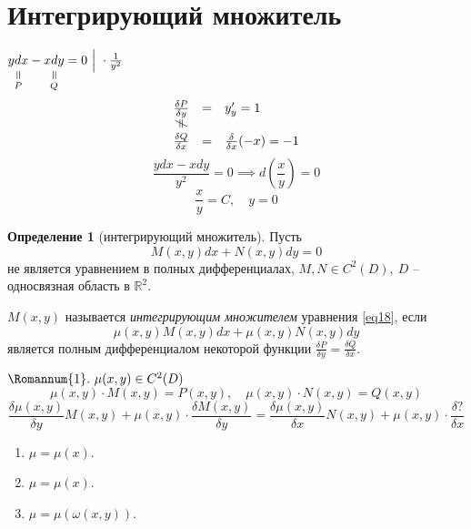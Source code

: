 \documentclass[11pt,a4paper,oneside]{report}
\newcommand{\verteq}[0]{\rotatebox{90}{$=$}}
\newcommand{\vertneq}[0]{\rotatebox{90}{$\ne$}}
\newcommand{\equalto}[2]{\underset{\scriptstyle\overset{\mkern4mu\verteq}{#2}}{#1}}
\theoremstyle{definition}
\newtheorem{definition}{Определение}[section]
\theoremstyle{plain}
\theoremstyle{remark}
\begin{document}
\section{Интегрирующий множитель}

$\equalto{ydx}{P} - \equalto{xdy}{Q} = 0 \ \Big| \ \cdot \frac{1}{y^2}$
\begin{equation*}
    \begin{array}{ccl}
        \frac{\delta P}{\delta y} & = & y_y' = 1                         \\
        \vertneq                  &   &                                  \\
        \frac{\delta Q}{\delta x} & = & \frac{\delta}{\delta x}(-x) = -1
    \end{array}
\end{equation*}
\begin{equation*}
    \frac{ydx - xdy}{y^2} = 0 \implies d\left(\frac{x}{y}\right) = 0
\end{equation*}
\begin{equation*}
    \frac{x}{y} = C, \quad y = 0
\end{equation*}

\begin{definition}[интегрирующий множитель]
    Пусть
    \begin{equation}\label{eq18}
        M(x,y)dx + N(x,y)dy = 0
    \end{equation}
    не является уравнением в полных дифференциалах, $M,N \in C^2(D), \ D$ -- односвязная область в $\mathbb{R}^2$.

    $M(x,y)$ называется \emph{интегрирующим множителем} уравнения \ref{eq18}, если
    \begin{equation*}
        \mu(x,y)M(x,y)dx + \mu(x,y)N(x,y)dy
    \end{equation*}
    является полным дифференциалом некоторой функции $\frac{\delta P}{\delta y} = \frac{\delta Q}{\delta x}$.
\end{definition}

$\Romannum{1}. \ \mu(x,y) \in C^2(D)$
\begin{equation*}
    \mu(x,y)\cdot M(x,y) = P(x,y), \quad \mu(x,y)\cdot N(x,y) = Q(x,y)
\end{equation*}
\begin{equation*}
    \frac{\delta \mu(x,y)}{\delta y}M(x,y) + \mu(x,y)\cdot\frac{\delta M(x,y)}{\delta y} = \frac{\delta\mu(x,y)}{\delta x}N(x,y) + \mu(x,y)\cdot\frac{\delta ?}{\delta x}
\end{equation*}
\begin{enumerate}
    \item $\mu = \mu(x)$.
    \item $\mu = \mu(x)$.
    \item $\mu = \mu(\omega(x,y))$.
\end{enumerate}
\end{document}
